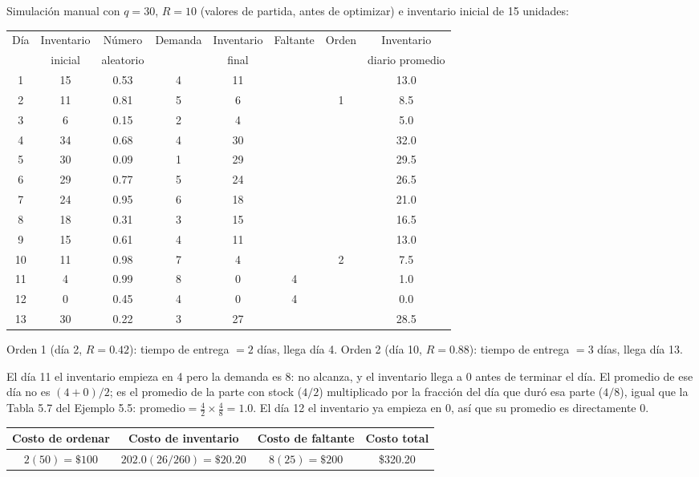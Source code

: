 Simulación manual con $q=30$, $R=10$ (valores de partida, antes de optimizar) e inventario inicial de 15 unidades:

\begin{center}
\small
\begin{tabular}{cccccccc}
\toprule
\multirow{2}{*}{Día} & Inventario & Número & \multirow{2}{*}{Demanda} & Inventario & \multirow{2}{*}{Faltante} & \multirow{2}{*}{Orden} & Inventario \\
 & inicial & aleatorio & & final & & & diario promedio \\
\midrule
1  & 15 & 0.53 & 4 & 11 &   &   & 13.0 \\
2  & 11 & 0.81 & 5 & 6  &   & 1 & 8.5  \\
3  & 6  & 0.15 & 2 & 4  &   &   & 5.0  \\
4  & 34 & 0.68 & 4 & 30 &   &   & 32.0 \\
5  & 30 & 0.09 & 1 & 29 &   &   & 29.5 \\
6  & 29 & 0.77 & 5 & 24 &   &   & 26.5 \\
7  & 24 & 0.95 & 6 & 18 &   &   & 21.0 \\
8  & 18 & 0.31 & 3 & 15 &   &   & 16.5 \\
9  & 15 & 0.61 & 4 & 11 &   &   & 13.0 \\
10 & 11 & 0.98 & 7 & 4  &   & 2 & 7.5  \\
11 & 4  & 0.99 & 8 & 0  & 4 &   & 1.0  \\
12 & 0  & 0.45 & 4 & 0  & 4 &   & 0.0  \\
13 & 30 & 0.22 & 3 & 27 &   &   & 28.5 \\
\bottomrule
\end{tabular}
\end{center}

Orden 1 (día 2, $R=0.42$): tiempo de entrega $=2$ días, llega día 4. Orden 2 (día 10, $R=0.88$): tiempo de entrega $=3$ días, llega día 13.

El día 11 el inventario empieza en 4 pero la demanda es 8: no alcanza, y el inventario llega a 0 antes de terminar el día. El promedio de ese día no es $(4+0)/2$; es el promedio de la parte con stock ($4/2$) multiplicado por la fracción del día que duró esa parte ($4/8$), igual que la Tabla 5.7 del Ejemplo 5.5: $\text{promedio} = \frac{4}{2}\times\frac{4}{8}=1.0$. El día 12 el inventario ya empieza en 0, así que su promedio es directamente 0.

\begin{center}
\begin{tabular}{cccc}
\toprule
Costo de ordenar & Costo de inventario & Costo de faltante & Costo total \\
\midrule
$2(50)=\$100$ & $202.0(26/260)=\$20.20$ & $8(25)=\$200$ & \$320.20 \\
\bottomrule
\end{tabular}
\end{center}

